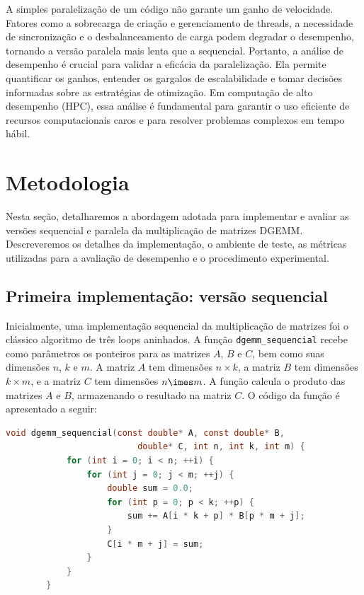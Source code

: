 \documentclass[12pt, a4paper]{article}
\begin{document}
	A simples paralelização de um código não garante um ganho de velocidade. Fatores
	como a sobrecarga de criação e gerenciamento de threads, a necessidade de
	sincronização e o desbalanceamento de carga podem degradar o desempenho, tornando
	a versão paralela mais lenta que a sequencial. Portanto, a análise de desempenho
	é crucial para validar a eficácia da paralelização. Ela permite quantificar os
	ganhos, entender os gargalos de escalabilidade e tomar decisões informadas sobre
	as estratégias de otimização. Em computação de alto desempenho (HPC), essa análise
	é fundamental para garantir o uso eficiente de recursos computacionais caros e
	para resolver problemas complexos em tempo hábil.

	\newpage
	\section{Metodologia}

	Nesta seção, detalharemos a abordagem adotada para implementar e avaliar as versões
	sequencial e paralela da multiplicação de matrizes DGEMM. Descreveremos
	os detalhes da implementação, o ambiente de teste, as métricas utilizadas para
	a avaliação de desempenho e o procedimento experimental.

	\subsection{Primeira implementação: versão sequencial}

	Inicialmente, uma implementação sequencial da multiplicação de matrizes foi
	o clássico algoritmo de três loops aninhados. A função \texttt{dgemm\_sequencial} recebe
	como parâmetros os ponteiros para as matrizes $A$, $B$ e $C$, bem como suas
	dimensões $n$, $k$ e $m$. A matriz $A$ tem dimensões $n \times k$, a matriz $B$ tem
	dimensões $k \times m$, e a matriz $C$ tem dimensões $n \imes m$. A função calcula o produto
	das matrizes $A$ e $B$, armazenando o resultado na matriz $C$. O código da função é apresentado a seguir:

	\begin{lstlisting}[language=C]
		void dgemm_sequencial(const double* A, const double* B, 
                          double* C, int n, int k, int m) {
            for (int i = 0; i < n; ++i) {
                for (int j = 0; j < m; ++j) {
                    double sum = 0.0;
                    for (int p = 0; p < k; ++p) {
                        sum += A[i * k + p] * B[p * m + j];
                    }
                    C[i * m + j] = sum;
                }
            }
        }
	\end{lstlisting}
\end{document}

